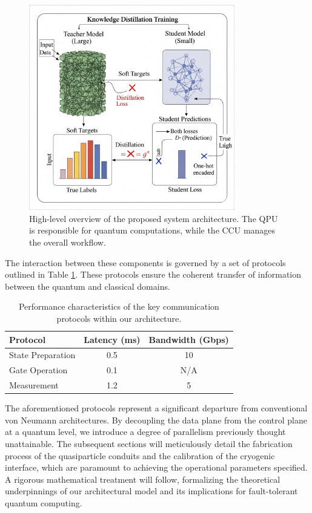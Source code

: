 \begin{figure}[h!]
    \centering
    \includegraphics[width=0.8\textwidth]{figures/example_figure.png}
    \caption{High-level overview of the proposed system architecture. The QPU is responsible for quantum computations, while the CCU manages the overall workflow.}
    \label{fig:system_overview}
\end{figure}

The interaction between these components is governed by a set of protocols outlined in Table \ref{tab:protocols}. These protocols ensure the coherent transfer of information between the quantum and classical domains.

\begin{table}[h!]
    \centering
    \begin{tabular}{|l|c|c|}
        \hline
        \textbf{Protocol} & \textbf{Latency (ms)} & \textbf{Bandwidth (Gbps)} \\
        \hline
        State Preparation & 0.5 & 10 \\
        Gate Operation & 0.1 & N/A \\
        Measurement & 1.2 & 5 \\
        \hline
    \end{tabular}
    \caption{Performance characteristics of the key communication protocols within our architecture.}
    \label{tab:protocols}
\end{table}

The aforementioned protocols represent a significant departure from conventional von Neumann architectures. By decoupling the data plane from the control plane at a quantum level, we introduce a degree of parallelism previously thought unattainable. The subsequent sections will meticulously detail the fabrication process of the quasiparticle conduits and the calibration of the cryogenic interface, which are paramount to achieving the operational parameters specified. A rigorous mathematical treatment will follow, formalizing the theoretical underpinnings of our architectural model and its implications for fault-tolerant quantum computing.

